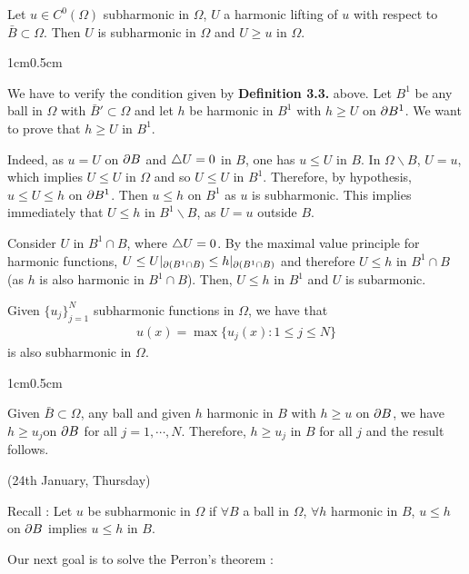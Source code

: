 \documentclass[12pt,a4paper]{article}
\newenvironment{proof}
{\begin{changemargin}{1cm}{0.5cm} 
	}%
	{\end{changemargin}
}
\newenvironment{p}
{\begin{proof} 
	}%
	{\end{proof}
}
\begin{document}
 Let $u\in C^0(\Omega)$ subharmonic in $\Omega$, $U$ a harmonic lifting of $u$ with respect to $\bar{B} \subset \Omega$. Then $U$ is subharmonic in $\Omega$ and $U\geq u$ in $\Omega$.
\begin{p}
\pf We have to verify the condition given by \textbf{Definition 3.3.} above. Let $B^1$ be any ball in $\Omega$ with $\bar{B}'\subset \Omega$ and let $h$ be harmonic in $B^1$ with $h\geq U$ on $\partial B^1$. We want to prove that $h\geq U$ in $B^1$.

\quad Indeed, as $u=U$ on $\partial B$ and $\triangle U=0$ in $B$, one has $u\leq U$ in $B$. In $\Omega \backslash B$, $U=u$, which implies $U\leq U$ in $\Omega$ and so $U\leq U$ in $B^1$. Therefore, by hypothesis, $u\leq U \leq h$ on $\partial B^1$. Then $u\leq h$ on $B^1$ as $u$ is subharmonic. This implies immediately that $U\leq h$ in $B^1\backslash B$, as $U=u$ outside $B$.

\quad Consider $U$ in $B^1 \cap B$, where $\triangle U=0$. By the maximal value principle for harmonic functions, $U\leq U|_{\partial (B^1 \cap B)}\leq h|_{\partial (B^1 \cap B)}$ and therefore $U\leq h$ in $B^1\cap B$(as $h$ is also harmonic in $B^1\cap B$). Then, $U\leq h$ in $B^1$ and $U$ is subarmonic.

\eop
\end{p}
\s

 Given $\{u_j\}_{j=1}^N$ subharmonic functions in $\Omega$, we have that 
\begin{align*}
u(x) = \max \{u_j(x) : 1\leq j\leq N\}
\end{align*}
is also subharmonic in $\Omega$.
\begin{proof}
\pf Given $\bar{B} \subset \Omega$, any ball and given $h$ harmonic in $B$ with $h\geq u$ on $\partial B$, we have $h\geq u_j$on $\partial B$ for all $j=1, \cdots, N$. Therefore, $h\geq u_j$ in $B$ for all $j$ and the result follows.

\eop
\end{proof}
\newday

(24th January, Thursday)
\s

Recall : Let $u$ be subharmonic in $\Omega$ if $\forall B$ a ball in $\Omega$, $\forall h$ harmonic in $B$, $u\leq h$ on $\partial B$ implies $u\leq h$ in $B$.
\s

Our next goal is to solve the Perron's theorem :
\s
\end{document}
